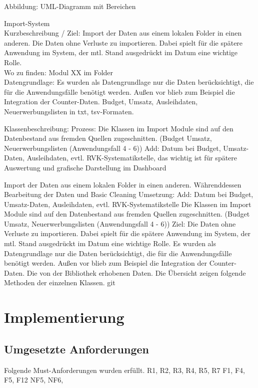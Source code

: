     Abbildung: UML-Diagramm mit Bereichen
    
    Import-System\\
    Kurzbeschreibung / Ziel: Import der Daten aus einem lokalen Folder in einen anderen. 
    Die Daten ohne Verluste zu importieren. Dabei spielt für die spätere Anwendung im System, der mtl. Stand ausgedrückt im Datum eine wichtige Rolle.\\
    Wo zu finden: Modul XX im Folder \\
    Datengrundlage: Es wurden als Datengrundlage nur die Daten berücksichtigt, die für die Anwendungsfälle benötigt werden.
    Außen vor blieb zum Beispiel die Integration der Counter-Daten.
    Budget, Umsatz, Ausleihdaten, Neuerwerbungslisten in txt, tsv-Formaten.
    
    Klassenbeschreibung:
    Prozess: Die Klassen im Import Module sind auf den Datenbestand aus fremden Quellen zugeschnitten.
    (Budget Umsatz, Neuerwerbungslisten (Anwendungsfall 4 - 6))
    Add: Datum bei Budget, Umsatz-Daten, Ausleihdaten, evtl. RVK-Systematikstelle, das wichtig ist für spätere Auswertung und grafische Darstellung
    im Dashboard
    
    
 
    
    
    Import der Daten aus einem lokalen Folder in einen anderen. 
    Währenddessen Bearbeitung der Daten und Basic Cleaning
    Umsetzung:
    Add: Datum bei Budget, Umsatz-Daten, Ausleihdaten, evtl. RVK-Systematikstelle 
    Die Klassen im Import Module sind auf den Datenbestand aus fremden Quellen zugeschnitten.
    (Budget Umsatz, Neuerwerbungslisten (Anwendungsfall 4 - 6))
    Ziel: Die Daten ohne Verluste zu importieren. Dabei spielt für die spätere Anwendung im System, der mtl. Stand
    ausgedrückt im Datum eine wichtige Rolle.
    Es wurden als Datengrundlage nur die Daten berücksichtigt, die für die Anwendungsfälle benötigt werden.
    Außen vor blieb zum Beispiel die Integration der Counter-Daten.
    Die von der Bibliothek erhobenen Daten. Die Übersicht zeigen folgende Methoden der einzelnen Klassen.
    git
    
    
    

\section{Implementierung}
    \subsection{Umgesetzte Anforderungen}
    Folgende Must-Anforderungen wurden erfüllt.
    R1, R2, R3, R4, R5, R7
    F1, F4, F5, F12
    NF5, NF6, 
